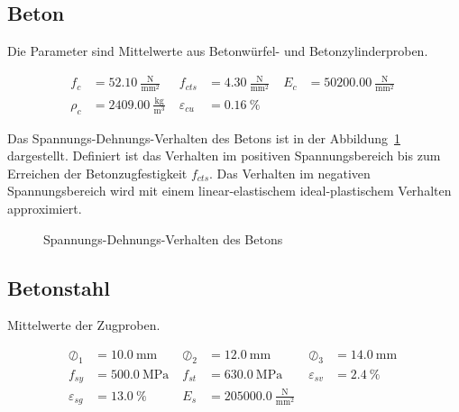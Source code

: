 \documentclass[
  11pt,
  letterpaper,
]{scrreprt}
\begin{document}
\subsection{Beton}\label{beton}

Die Parameter sind Mittelwerte aus Betonwürfel- und Betonzylinderproben.

$$
\begin{aligned}
f_{c} &= 52.10\ \frac{\mathrm{N}}{\mathrm{mm}^{2}} \; 
 &f_{cts} &= 4.30\ \frac{\mathrm{N}}{\mathrm{mm}^{2}} \; 
 &E_{c} &= 50200.00\ \frac{\mathrm{N}}{\mathrm{mm}^{2}} \; 
\\[12pt]
 \rho_{c} &= 2409.00\ \frac{\mathrm{kg}}{\mathrm{m}^{3}} \; 
 &\varepsilon_{cu} &= 0.16\ \mathrm{\%} \;
\end{aligned}
$$

Das Spannungs-Dehnungs-Verhalten des Betons ist in der
Abbildung~\ref{fig-sigma_epc_t6} dargestellt. Definiert ist das
Verhalten im positiven Spannungsbereich bis zum Erreichen der
Betonzugfestigkeit \(f_{cts}\). Das Verhalten im negativen
Spannungsbereich wird mit einem linear-elastischem ideal-plastischem
Verhalten approximiert.

\begin{figure}[H]


\caption{\label{fig-sigma_epc_t6}Spannungs-Dehnungs-Verhalten des
Betons}

\end{figure}%

\subsection{Betonstahl}\label{betonstahl}

Mittelwerte der Zugproben.

$$
\begin{aligned}
\oslash_{1} &= 10.0\ \mathrm{mm} \; 
 &\oslash_{2} &= 12.0\ \mathrm{mm} \; 
 &\oslash_{3} &= 14.0\ \mathrm{mm} \; 
\\[12pt]
 f_{sy} &= 500.0\ \mathrm{MPa} \; 
 &f_{st} &= 630.0\ \mathrm{MPa} \; 
 &\varepsilon_{sv} &= 2.4\ \mathrm{\%} \; 
\\[12pt]
 \varepsilon_{sg} &= 13.0\ \mathrm{\%} \; 
 &E_{s} &= 205000.0\ \frac{\mathrm{N}}{\mathrm{mm}^{2}} \;
\end{aligned}
$$
\end{document}
